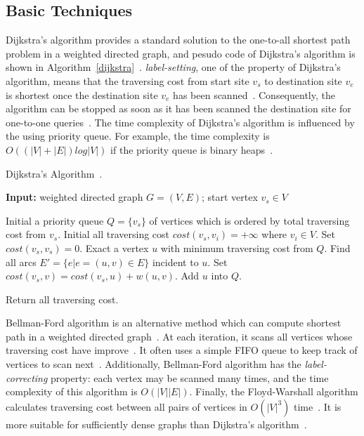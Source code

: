 \documentclass[conference]{IEEEtran}
\begin{document}
\subsection{Basic Techniques}\label{subsec:basic_techniques}
Dijkstra's algorithm provides a standard solution to the one-to-all shortest path problem in a weighted directed graph, and pesudo code of Dijkstra's algorithm is shown in Algorithm~\ref{dijkstra}~\cite{dijkstra1959note}. \emph{label-setting}, one of the property of Dijkstra's algorithm, means that the traversing cost from start site $v_s$ to destination site $v_e$ is shortest once the destination site $v_e$ has been scanned~\cite{dijkstra1959note}. Consequently, the algorithm can be stopped as soon as it has been scanned the destination site for one-to-one queries~\cite{bast2016route}. The time complexity of Dijkstra's algorithm is influenced by the using priority queue. For example, the time complexity is $O((|V|+|E|)log|V|)$ if the priority queue is binary heaps~\cite{forsythe1964algorithms}.
\begin{algorithm}[htbp]
	\caption{\label{dijkstra}Dijkstra's Algorithm~\cite{dijkstra1959note}.}
	{\bf Input:} weighted directed graph $G=(V, E)$; start vertex $v_s \in V$
	\begin{algorithmic}[1]
		\State Initial a priority queue $Q=\{v_s\}$ of vertices which is ordered by total traversing cost from $v_s$.
		\State Initial all traversing cost $cost(v_s, v_i)=+\infty$ where $v_i \in V$.
		\State Set $cost(v_s, v_s) = 0$.
		\State Exact a vertex $u$ with minimum traversing cost from $Q$.
		\State Find all arcs $E' = \{e | e=(u, v) \in E\}$ incident to $u$.
		\State Set $cost(v_s, v) = cost(v_s, u)+w(u,v)$.
		\EndIf
		\State Add $u$ into $Q$.
		\EndFor
		
		\EndWhile
		\State Return all traversing cost.
	\end{algorithmic}
\end{algorithm}

Bellman-Ford algorithm is an alternative method which can compute shortest path in a weighted directed graph~\cite{bellman1958routing, ford1956network}. At each iteration, it scans all vertices whose traversing cost have improve~\cite{bellman1958routing, ford1956network}. It often uses a simple FIFO queue to keep track of vertices to scan next~\cite{bast2016route}.  Additionally, Bellman-Ford algorithm has the \emph{label-correcting} property: each vertex may be scanned many times, and the time complexity of this algorithm is $O(|V||E|)$. Finally, the Floyd-Warshall algorithm calculates traversing cost between all pairs of vertices in $O(|V|^3)$ time~\cite{floyd1962algorithm}. It is more suitable for sufficiently dense graphs than Dijkstra's algorithm~\cite{bast2016route}.
\end{document}
